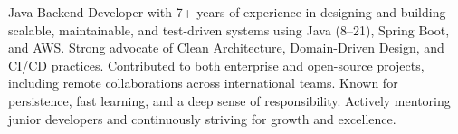 
\begin{cvparagraph}

Java Backend Developer with 7+ years of experience in designing and building scalable, maintainable, and test-driven systems using Java (8–21), Spring Boot, and AWS. Strong advocate of Clean Architecture, Domain-Driven Design, and CI/CD practices. Contributed to both enterprise and open-source projects, including remote collaborations across international teams. Known for persistence, fast learning, and a deep sense of responsibility. Actively mentoring junior developers and continuously striving for growth and excellence.
\end{cvparagraph}
